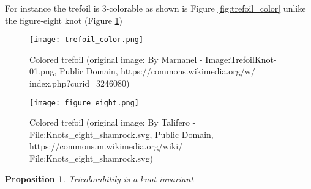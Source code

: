 \documentclass[12pt, a4paper]{article}
\newtheorem{proposition}{Proposition}
\begin{document}
For instance the trefoil is 3-colorable as shown is Figure \ref{fig:trefoil_color} unlike the figure-eight knot (Figure \ref{fig:figure8})\\


\begin{figure}[H]
  \begin{minipage}[c]{.4\textwidth}
    \centering
    \texttt{[image: trefoil\_color.png]}
    \caption{Colored trefoil (original image: By Marnanel - Image:TrefoilKnot-01.png, Public Domain, https://commons.wikimedia.org/w/ index.php?curid=3246080)}
    \label{fig:trefoil_color}
  \end{minipage}
  \hfill
  \begin{minipage}[c]{.4\textwidth}
    \centering
    \texttt{[image: figure\_eight.png]}
    \caption{Colored trefoil (original image: By Talifero - File:Knots\_eight\_shamrock.svg, Public Domain, https://commons.m.wikimedia.org/wiki/ File:Knots\_eight\_shamrock.svg)}
    \label{fig:figure8}
  \end{minipage}  
\end{figure}

\begin{proposition}
  Tricolorabitily is a knot invariant
\end{proposition}
\end{document}
